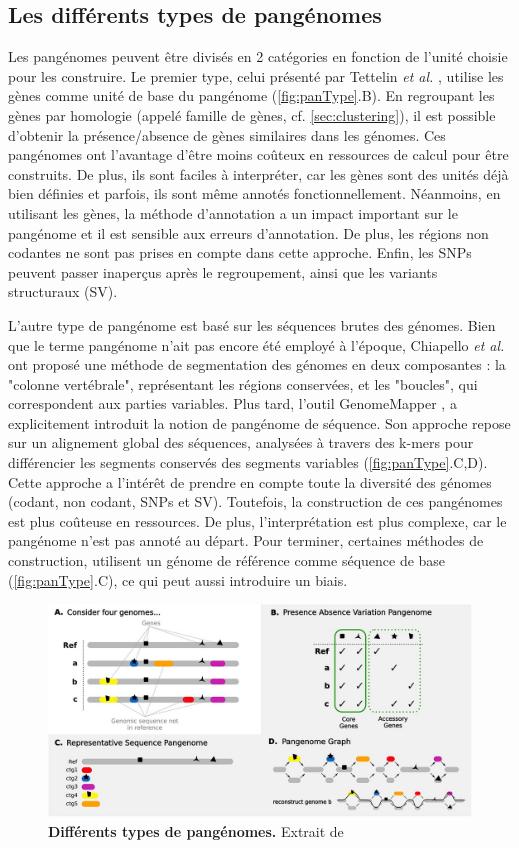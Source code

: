 \newpage

\subsection{Les différents types de pangénomes}

Les pangénomes peuvent être divisés en 2 catégories en fonction de l'unité choisie pour les construire. Le premier type, celui présenté par Tettelin \textit{et al.} \cite{tettelin_genome_2005}, utilise les gènes comme unité de base du pangénome (\autoref{fig:panType}.B). En regroupant les gènes par homologie (appelé famille de gènes, cf. \autoref{sec:clustering}), il est possible d'obtenir la présence/absence de gènes similaires dans les génomes. Ces pangénomes ont l'avantage d'être moins coûteux en ressources de calcul pour être construits. De plus, ils sont faciles à interpréter, car les gènes sont des unités déjà bien définies et parfois, ils sont même annotés fonctionnellement. Néanmoins, en utilisant les gènes, la méthode d'annotation a un impact important sur le pangénome et il est sensible aux erreurs d'annotation. De plus, les régions non codantes ne sont pas prises en compte dans cette approche. Enfin, les SNPs peuvent passer inaperçus après le regroupement, ainsi que les variants structuraux (SV).

L'autre type de pangénome est basé sur les séquences brutes des génomes. Bien que le terme pangénome n’ait pas encore été employé à l’époque, Chiapello \textit{et al.} \cite{chiapello_systematic_2005} ont proposé une méthode de segmentation des génomes en deux composantes : la "colonne vertébrale", représentant les régions conservées, et les "boucles", qui correspondent aux parties variables. Plus tard, l’outil GenomeMapper \cite{schneeberger_simultaneous_2009}, a explicitement introduit la notion de pangénome de séquence. Son approche repose sur un alignement global des séquences, analysées à travers des k-mers pour différencier les segments conservés des segments variables (\autoref{fig:panType}.C,D). Cette approche a l'intérêt de prendre en compte toute la diversité des génomes (codant, non codant, SNPs et SV). Toutefois, la construction de ces pangénomes est plus coûteuse en ressources. De plus, l'interprétation est plus complexe, car le pangénome n'est pas annoté au départ. Pour terminer, certaines méthodes de construction, utilisent un génome de référence comme séquence de base (\autoref{fig:panType}.C), ce qui peut aussi introduire un biais.

\begin{figure}[htbp]
    \centering
    \includegraphics[width=0.8\linewidth]{images/pangenomeTypes.jpeg}
    \caption[Différents types de pangénomes]{\textbf{Différents types de pangénomes.} Extrait de \cite{matthews_gentle_2024}}
    \label{fig:panType}
\end{figure}
